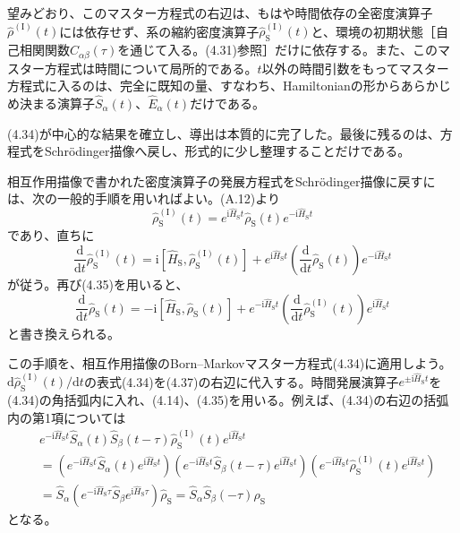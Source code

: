 \hypertarget{srcpage:164}{}\label{srcpage:164}
望みどおり、このマスター方程式の右辺は、もはや時間依存の全密度演算子$\hat\rho^{(\mathrm I)}(t)$には依存せず、系の縮約密度演算子$\hat\rho^{(\mathrm I)}_{\mathrm S}(t)$と、環境の初期状態［自己相関関数$C_{\alpha\beta}(\tau)$を通じて入る。(4.31)参照］だけに依存する。また、このマスター方程式は時間について局所的である。$t$以外の時間引数をもってマスター方程式に入るのは、完全に既知の量、すなわち、Hamiltonianの形からあらかじめ決まる演算子$\hat S_\alpha(t)$、$\hat E_\alpha(t)$だけである。

(4.34)が中心的な結果を確立し、導出は本質的に完了した。最後に残るのは、方程式をSchrödinger描像へ戻し、形式的に少し整理することだけである。

相互作用描像で書かれた密度演算子の発展方程式をSchrödinger描像に戻すには、次の一般的手順を用いればよい。(A.12)より
\begin{equation}
\hat\rho^{(\mathrm I)}_{\mathrm S}(t)=e^{\mathrm i\hat H_{\mathrm S}t}\hat\rho_{\mathrm S}(t)e^{-\mathrm i\hat H_{\mathrm S}t}
\tag{4.35}
\end{equation}
であり、直ちに
\begin{equation}
\frac{\mathrm d}{\mathrm dt}\hat\rho^{(\mathrm I)}_{\mathrm S}(t)
=\mathrm i[\hat H_{\mathrm S},\hat\rho^{(\mathrm I)}_{\mathrm S}(t)]
+e^{\mathrm i\hat H_{\mathrm S}t}\left(\frac{\mathrm d}{\mathrm dt}\hat\rho_{\mathrm S}(t)\right)e^{-\mathrm i\hat H_{\mathrm S}t}
\tag{4.36}
\end{equation}
が従う。再び(4.35)を用いると、
\begin{equation}
\frac{\mathrm d}{\mathrm dt}\hat\rho_{\mathrm S}(t)
=-\mathrm i[\hat H_{\mathrm S},\hat\rho_{\mathrm S}(t)]
+e^{-\mathrm i\hat H_{\mathrm S}t}\left(\frac{\mathrm d}{\mathrm dt}\hat\rho^{(\mathrm I)}_{\mathrm S}(t)\right)e^{\mathrm i\hat H_{\mathrm S}t}
\tag{4.37}
\end{equation}
と書き換えられる。

この手順を、相互作用描像のBorn--Markovマスター方程式(4.34)に適用しよう。$\mathrm d\hat\rho^{(\mathrm I)}_{\mathrm S}(t)/\mathrm dt$の表式(4.34)を(4.37)の右辺に代入する。時間発展演算子$e^{\pm\mathrm i\hat H_{\mathrm S}t}$を(4.34)の角括弧内に入れ、(4.14)、(4.35)を用いる。例えば、(4.34)の右辺の括弧内の第1項については
\begin{equation}
\begin{aligned}
&e^{-\mathrm i\hat H_{\mathrm S}t}\hat S_\alpha(t)\hat S_\beta(t-\tau)\hat\rho^{(\mathrm I)}_{\mathrm S}(t)e^{\mathrm i\hat H_{\mathrm S}t}\\
&=(e^{-\mathrm i\hat H_{\mathrm S}t}\hat S_\alpha(t)e^{\mathrm i\hat H_{\mathrm S}t})
(e^{-\mathrm i\hat H_{\mathrm S}t}\hat S_\beta(t-\tau)e^{\mathrm i\hat H_{\mathrm S}t})
(e^{-\mathrm i\hat H_{\mathrm S}t}\hat\rho^{(\mathrm I)}_{\mathrm S}(t)e^{\mathrm i\hat H_{\mathrm S}t})\\
&=\hat S_\alpha(e^{-\mathrm i\hat H_{\mathrm S}\tau}\hat S_\beta e^{\mathrm i\hat H_{\mathrm S}\tau})\hat\rho_{\mathrm S}
=\hat S_\alpha\hat S_\beta(-\tau)\hat\rho_{\mathrm S}
\end{aligned}\tag{4.38}
\end{equation}
となる。

